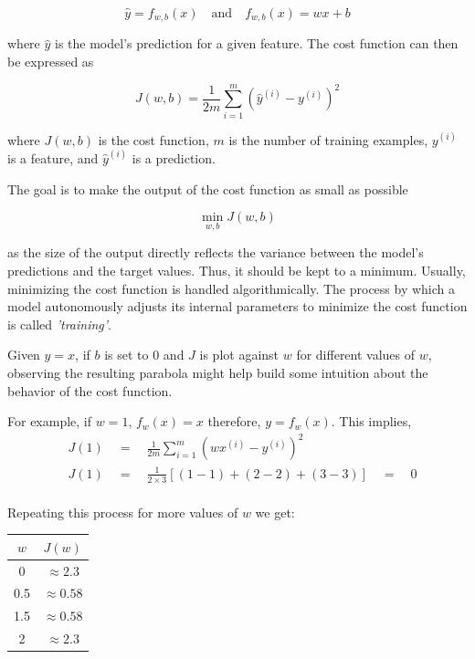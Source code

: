 \documentclass{article}
\begin{document}
\[
\hat{y} =  f_{w, b}(x) \quad \textrm{and} \quad f_{w, b}(x) = wx + b
\]

\noindent where $\hat{y}$ is the model's prediction for a given feature. The cost function can then be expressed as

\[ J(w, b) = \frac{1}{2m}\sum^{m}_{i = 1}{ ({ \hat{y}^{(i)} - y^{(i)} })^2 }\]

\noindent where $J(w, b)$ is the cost function, $m$ is the number of training examples, $y^{(i)}$ is a feature, and $\hat{y}^{(i)}$ is a prediction.

\noindent The goal is to make the output of the cost function as small as possible

\[\min_{w, b}J(w, b)\]

\noindent as the size of the output directly reflects the variance between the model's predictions and the target values. Thus, it should be kept to a minimum. Usually, minimizing the cost function is handled algorithmically. The process by which a model autonomously adjusts its internal parameters to minimize the cost function is called \textit{'training'}.

Given $y = x$, if $b$ is set to 0 and $J$ is plot against $w$ for different values of $w$, observing the resulting parabola might help build some intuition about the behavior of the cost function.

\noindent For example, if $w = 1$, $f_{w}(x) = x$ therefore, $y = f_{w}(x)$. This implies,
\begin{align*}
&J(1) \quad=\quad \frac{1}{2m}\sum^m_{i=1}{ (wx^{(i)} - y^{(i)})^2 } \\
&J(1) \quad=\quad \frac{1}{2\times3}[(1-1) + (2-2) + (3-3)] \quad=\quad 0 \\
\end{align*}

\noindent Repeating this process for more values of $w$ we get:

\begin{center}
\centering
\begin{tabular}{|c|c|}
\hline
\textbf{$w$} & \textbf{$J(w)$} \\
\hline
0 & $\approx 2.3$ \\
\hline
0.5 & $\approx 0.58$ \\
\hline
1.5 & $\approx 0.58$ \\
\hline
2 & $\approx 2.3$ \\
\hline
\end{tabular}
\end{center}
\end{document}
